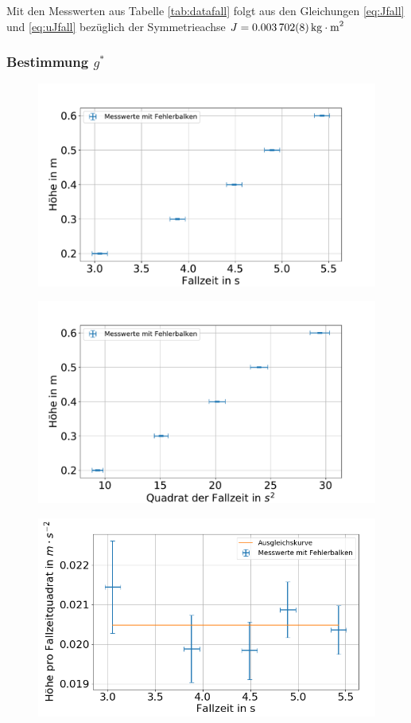 Mit den Messwerten aus Tabelle \ref{tab:datafall} folgt aus den Gleichungen \ref{eq:Jfall} und \ref{eq:uJfall} bezüglich der Symmetrieachse $J=\SI{0.003702 \pm 0.000008}{kg\cdot m^2}$








\subsubsection{Bestimmung $g^*$ }



\begin{figure}[h]
	\centering
	\includegraphics[width=0.7\linewidth]{auswertung/Fallrad/h,t}
	\caption{}
	\label{fig:ht}
\end{figure}




\begin{figure}[h]
	\centering
	\includegraphics[width=0.7\linewidth]{auswertung/Fallrad/h,t^2}
	\caption{}
	\label{fig:ht2}
\end{figure}




\begin{figure}[h]
	\centering
	\includegraphics[width=0.7\linewidth]{auswertung/Fallrad/T,ht^-2}
	\caption{}
	\label{fig:tht-2}
\end{figure}


